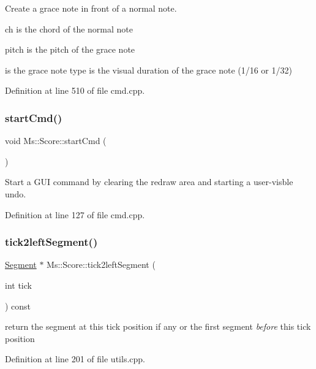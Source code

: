 Create a grace note in front of a normal note. \begin{DoxyItemize}
\item ch is the chord of the normal note \item pitch is the pitch of the grace note \item is the grace note type  is the visual duration of the grace note (1/16 or 1/32) \end{DoxyItemize}


Definition at line 510 of file cmd.\+cpp.

\mbox{\label{class_ms_1_1_score_a687f074b331fe27ebec4b4d596f91e0e}} 
\subsubsection{\texorpdfstring{start\+Cmd()}{startCmd()}}
{\footnotesize\ttfamily void Ms\+::\+Score\+::start\+Cmd (\begin{DoxyParamCaption}{ }\end{DoxyParamCaption})}

Start a G\+UI command by clearing the redraw area and starting a user-\/visble undo. 

Definition at line 127 of file cmd.\+cpp.

\mbox{\label{class_ms_1_1_score_a99f40d5c26372dc67b3d028816de5917}} 
\subsubsection{\texorpdfstring{tick2left\+Segment()}{tick2leftSegment()}}
{\footnotesize\ttfamily \hyperlink{class_ms_1_1_segment}{Segment} $\ast$ Ms\+::\+Score\+::tick2left\+Segment (\begin{DoxyParamCaption}\item[{int}]{tick }\end{DoxyParamCaption}) const}

return the segment at this tick position if any or the first segment {\itshape before} this tick position 

Definition at line 201 of file utils.\+cpp.

